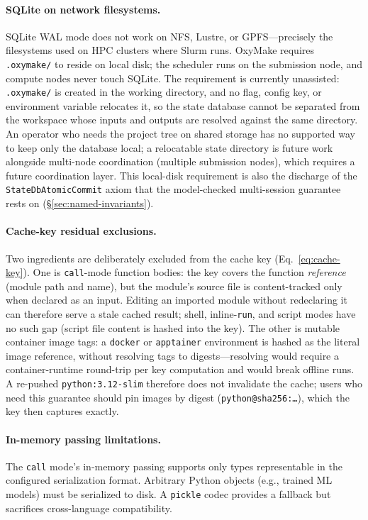 \documentclass[12pt,a4paper]{article}
\newcommand{\code}[1]{{\texttt{\small\color{inlinecode}#1}}}
\begin{document}
\paragraph{SQLite on network filesystems.}
SQLite WAL mode does not work on NFS, Lustre, or GPFS---precisely the
filesystems used on HPC clusters where Slurm runs. OxyMake requires
\code{.oxymake/} to reside on local disk; the scheduler runs on the
submission node, and compute nodes never touch SQLite. The requirement
is currently unassisted: \code{.oxymake/} is created in the working
directory, and no flag, config key, or environment variable relocates
it, so the state database cannot be separated from the workspace whose
inputs and outputs are resolved against the same directory. An operator
who needs the project tree on shared storage has no supported way to
keep only the database local; a relocatable state directory is future
work alongside multi-node coordination (multiple submission nodes),
which requires a future coordination layer. This local-disk requirement
is also the discharge of the \code{StateDbAtomicCommit} axiom that the
model-checked multi-session guarantee rests on
(\S\ref{sec:named-invariants}).

\paragraph{Cache-key residual exclusions.}
Two ingredients are deliberately excluded from the cache key
(Eq.~\ref{eq:cache-key}). One is \code{call}-mode function bodies: the
key covers the function \emph{reference} (module path and name), but the
module's source file is content-tracked only when declared as an input.
Editing an imported module without redeclaring it can therefore serve a
stale cached result; shell, inline-\code{run}, and script modes have no
such gap (script file content is hashed into the key). The other is
mutable container image tags: a \code{docker} or \code{apptainer} environment is
hashed as the literal image reference, without resolving tags to
digests---resolving would require a container-runtime round-trip per key
computation and would break offline runs. A re-pushed
\code{python:3.12-slim} therefore does not invalidate the cache; users
who need this guarantee should pin images by digest
(\code{python@sha256:\ldots}), which the key then captures exactly.

\paragraph{In-memory passing limitations.}
The \code{call} mode's in-memory passing supports only types
representable in the configured serialization format. Arbitrary Python
objects (e.g., trained ML models) must be serialized to disk.
A \code{pickle} codec provides a fallback but sacrifices cross-language
compatibility.
\end{document}
